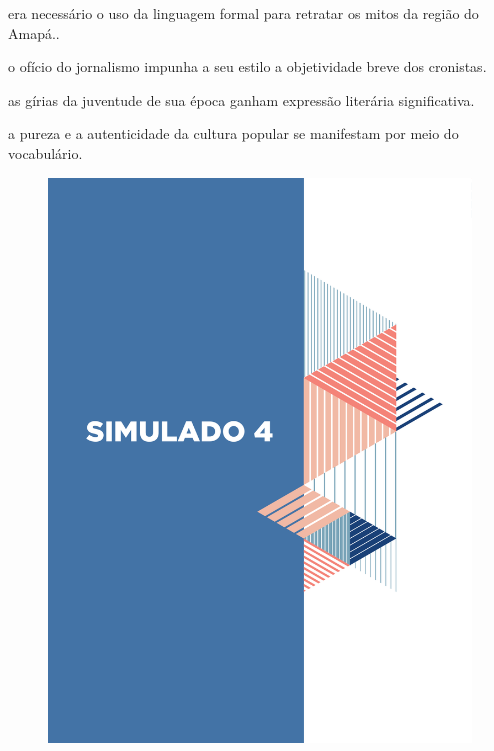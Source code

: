 \begin{escolha}
    
    \item era necessário o uso da linguagem formal para retratar os mitos da região do Amapá..
    
    \item o ofício do jornalismo impunha a seu estilo a objetividade breve dos cronistas.
    
    \item as gírias da juventude de sua época ganham expressão literária significativa.
    
    \item a pureza e a autenticidade da cultura popular se manifestam por meio do vocabulário.

\end{escolha}


\begin{figure}
\vspace*{-3cm}
\hspace*{-3.7cm}\includegraphics[scale=1]{../watermarks/4simulado9ano.pdf}
\end{figure}


